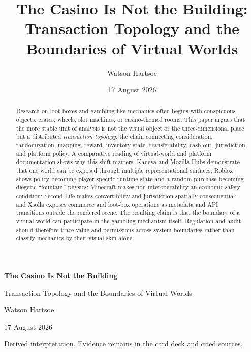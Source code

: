 \documentclass[11pt]{article}
\title{The Casino Is Not the Building:\\Transaction Topology and the Boundaries of Virtual Worlds}
\author{Watson Hartsoe}
\date{17 August 2026}
\newcommand{\aimark}{\tikz[baseline=-0.7ex,scale=.18]{\draw[line width=.55pt,line cap=round] (0,0) circle (.10);\draw[line width=.45pt,line cap=round] (-.055,-.015) .. controls (0,-.07) and (.055,-.07) .. (.075,-.015);\draw[line width=.7pt,line cap=round] (.18,-.14) arc[start angle=-38,end angle=55,radius=.28];\draw[line width=.7pt,line cap=round] (.31,-.25) arc[start angle=-39,end angle=56,radius=.46];\draw[line width=.7pt,line cap=round] (.46,-.37) arc[start angle=-40,end angle=57,radius=.66];}}
\begin{document}
\begin{titlepage}
\centering
\vspace{1.05in}
{\LARGE\bfseries The Casino Is Not the Building\par}
\vspace{0.2in}
{\Large Transaction Topology and the Boundaries of Virtual Worlds\par}
\vfill
{\large Watson Hartsoe\par}
\vspace{0.12in}
{\normalsize 17 August 2026\par}
\vfill
{\footnotesize Derived interpretation. Evidence remains in the card deck and cited sources.\par}
\end{titlepage}

\begin{abstract}
Research on loot boxes and gambling-like mechanics often begins with conspicuous objects: crates, wheels, slot machines, or casino-themed rooms. This paper argues that the more stable unit of analysis is not the visual object or the three-dimensional place but a distributed \emph{transaction topology}: the chain connecting consideration, randomization, mapping, reward, inventory state, transferability, cash-out, jurisdiction, and platform policy. A comparative reading of virtual-world and platform documentation shows why this shift matters. Kaneva and Mozilla Hubs demonstrate that one world can be exposed through multiple representational surfaces; Roblox shows policy becoming player-specific runtime state and a random purchase becoming diegetic ``fountain'' physics; Minecraft makes non-interoperability an economic safety condition; Second Life makes convertibility and jurisdiction spatially consequential; and Xsolla exposes commerce and loot-box operations as metadata and API transitions outside the rendered scene. The resulting claim is that the boundary of a virtual world can participate in the gambling mechanism itself. Regulation and audit should therefore trace value and permissions across system boundaries rather than classify mechanics by their visual skin alone.
\end{abstract}
\end{document}
